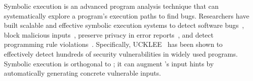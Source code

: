  Symbolic execution is an advanced program
analysis technique that can systematically explore a program's execution paths
to find bugs. Researchers have built scalable and effective symbolic execution 
systems to detect software 
bugs~\cite{dart:pldi,cute:fse,godefroid:grammar-fuzzing,
godefroid:whitebox-fuzzing,
klee:osdi08,yang:malicious-disk:oakland06,cadar:exe:ccs06,s2e:hotdep09,
taas:socc10, ucklee:usec15}, block malicious 
inputs~\cite{castro:bouncer}, preserve privacy in error 
reports~\cite{castro:bug-report-privacy}, and detect programming rule 
violations~\cite{woodpecker:asplos13}. Specifically, 
UCKLEE~\cite{ucklee:usec15} has been shown to effectively detect hundreds of 
security vulnerabilities in widely used programs. Symbolic execution 
is orthogonal to \xxx; it can augment \xxx's input hints by automatically 
generating concrete vulnerable inputs.
